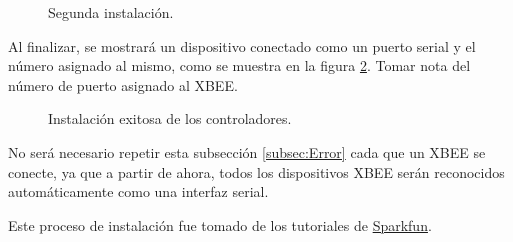 \begin{figure}[H] %
\caption[1]{Segunda instalación.}
\label{fig:Inst2}
\end{figure}

Al finalizar, se mostrará un dispositivo conectado como un puerto serial y el número asignado al mismo, como se muestra en la figura \ref{fig:Success}. Tomar nota del número de puerto asignado al XBEE.

\begin{figure}[H] %
\caption[1]{Instalación exitosa de los controladores.}
\label{fig:Success}
\end{figure}

No será necesario repetir esta subsección \ref{subsec:Error} cada que un XBEE se conecte, ya que a partir de ahora, todos los dispositivos XBEE serán reconocidos automáticamente como una interfaz serial.

Este proceso de instalación fue tomado de los tutoriales de \href{https://learn.sparkfun.com/tutorials/how-to-install-ftdi-drivers/all}{Sparkfun}\footnotemark.


